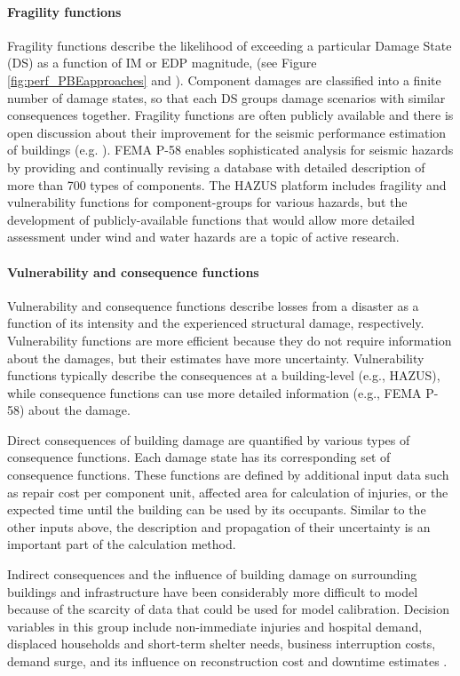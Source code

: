\paragraph{Fragility functions} Fragility functions describe the likelihood of exceeding a particular Damage State (DS) as a function of IM or EDP magnitude, (see Figure \ref{fig:perf_PBEapproaches} and \citep{baker2021seismic}). Component damages are classified into a finite number of damage states, so that each DS groups damage scenarios with similar consequences together. Fragility functions are often publicly available and there is open discussion about their improvement for the seismic performance estimation of buildings (e.g. \cite{silva2019current}). FEMA P-58 enables sophisticated analysis for seismic hazards by providing \citep{atc2012p-58} and continually revising \citep{atc2018p-58-1} a database with detailed description of more than 700 types of components. The HAZUS platform includes fragility and vulnerability functions for component-groups for various hazards, but the development of publicly-available functions that would allow more detailed assessment under wind and water hazards are a topic of active research.

\paragraph{Vulnerability and consequence functions} Vulnerability and consequence functions describe losses from a disaster as a function of its intensity and the experienced structural damage, respectively. Vulnerability functions are more efficient because they do not require information about the damages, but their estimates have more uncertainty. Vulnerability functions typically describe the consequences at a building-level (e.g., HAZUS), while consequence functions can use more detailed information (e.g., FEMA P-58) about the damage.

Direct consequences of building damage are quantified by various types of consequence functions. Each damage state has its corresponding set of consequence functions. These functions are defined by additional input data such as repair cost per component unit, affected area for calculation of injuries, or the expected time until the building can be used by its occupants. Similar to the other inputs above, the description and propagation of their uncertainty is an important part of the calculation method.

Indirect consequences and the influence of building damage on surrounding buildings and infrastructure have been considerably more difficult to model because of the scarcity of data that could be used for model calibration. Decision variables in this group include non-immediate injuries and hospital demand, displaced households and short-term shelter needs, business interruption costs, demand surge, and its influence on reconstruction cost and downtime estimates \citep{arup2013resiliencebased}.

